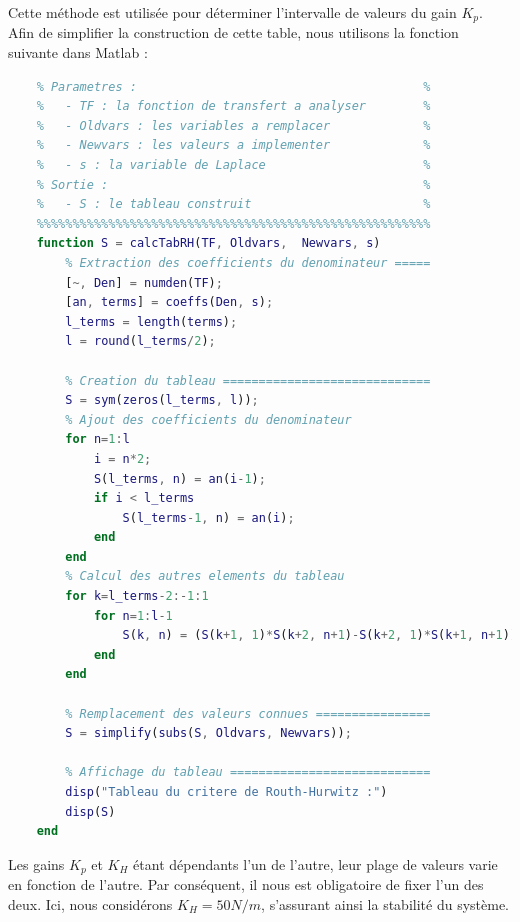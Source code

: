 \documentclass[a4paper,12pt]{article}
\begin{document}
    Cette méthode est utilisée pour déterminer l'intervalle de valeurs du gain $K_p$. Afin de simplifier la construction de cette table, nous utilisons la fonction suivante dans Matlab :
    \begin{lstlisting}[label={code:fctCritRH}, caption={Fonction Matlab génération du critère de Routh-Hurwitz}, language=Matlab]
    %%%%%%%%%%%%%%%%%%%%%%%%%%%%%%%%%%%%%%%%%%%%%%%%%%%%%%%
    % Parametres :                                        %
    %   - TF : la fonction de transfert a analyser        %
    %   - Oldvars : les variables a remplacer             %
    %   - Newvars : les valeurs a implementer             %
    %   - s : la variable de Laplace                      %
    % Sortie :                                            %
    %   - S : le tableau construit                        %
    %%%%%%%%%%%%%%%%%%%%%%%%%%%%%%%%%%%%%%%%%%%%%%%%%%%%%%%
    function S = calcTabRH(TF, Oldvars,  Newvars, s)
        % Extraction des coefficients du denominateur =====
        [~, Den] = numden(TF);
        [an, terms] = coeffs(Den, s);
        l_terms = length(terms);
        l = round(l_terms/2);

        % Creation du tableau =============================
        S = sym(zeros(l_terms, l));
        % Ajout des coefficients du denominateur
        for n=1:l
            i = n*2;
            S(l_terms, n) = an(i-1);
            if i < l_terms
                S(l_terms-1, n) = an(i);
            end
        end
        % Calcul des autres elements du tableau
        for k=l_terms-2:-1:1
            for n=1:l-1
                S(k, n) = (S(k+1, 1)*S(k+2, n+1)-S(k+2, 1)*S(k+1, n+1))/S(k+1, 1);
            end
        end

        % Remplacement des valeurs connues ================
        S = simplify(subs(S, Oldvars, Newvars));

        % Affichage du tableau ============================
        disp("Tableau du critere de Routh-Hurwitz :")
        disp(S)
    end
    \end{lstlisting}

    Les gains $K_p$ et $K_H$ étant dépendants l'un de l'autre, leur plage de valeurs varie en fonction de l'autre. Par conséquent, il nous est obligatoire de fixer l'un des deux. Ici, nous considérons $K_H = 50 N/m$, s'assurant ainsi la stabilité du système.
    
\end{document}
